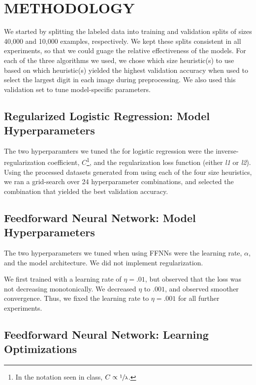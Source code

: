 \documentclass[letterpaper, 10 pt, conference]{ieeeconf}  %
\begin{document}
\section{METHODOLOGY}

We started by splitting the labeled data into training and validation splits of sizes 40,000 and 10,000 examples, respectively. We kept these splits consistent in all experiments, so that we could guage the relative effectiveness of the models. For each of the three algorithms we used, we chose which size heuristic(s) to use based on which heuristic(s) yielded the highest validation accuracy when used to select the largest digit in each image during preprocessing. We also used this validation set to tune model-specific parameters.

\subsection{Regularized Logistic Regression: Model Hyperparameters} 

The two hyperparamters we tuned the for logistic regression were the inverse-regularization coefficient, $C$\footnote{In the notation seen in class, $C \propto \sfrac{1}{\lambda}$.}, and the regularization loss function (either \emph{l1} or \emph{l2}). Using the processed datasets generated from using each of the four size heuristics, we ran a grid-search over 24 hyperparameter combinations, and selected the combination that yielded the best validation accuracy.   

\subsection{Feedforward Neural Network: Model Hyperparameters} 

The two hyperparameters we tuned when using FFNNs were the learning rate, $\alpha$, and the model architecture. We did not implement regularization.

We first trained with a learning rate of $\eta = .01$, but observed that the loss was not decreasing monotonically. We decreased $\eta$ to $.001$, and observed smoother convergence. Thus, we fixed the learning rate to $\eta = .001$ for all further experiments. 

\subsection{Feedforward Neural Network: Learning Optimizations} 
\end{document}
